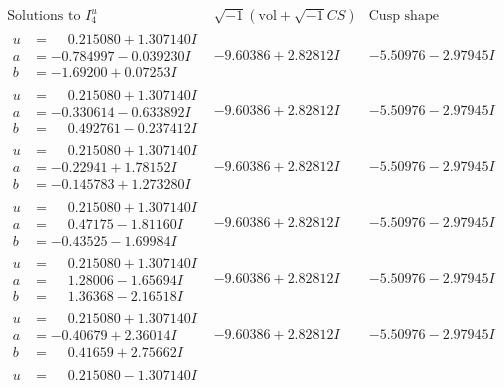 \documentclass[1p]{elsarticle_modified}
\theoremstyle{definition}
\newcommand{\I}{\sqrt{-1}}
\begin{document}
$$\begin{array}{c|c|c}  
\text{Solutions to }I^u_{4}& \I (\text{vol} + \sqrt{-1}CS) & \text{Cusp shape}\\
 \hline 
\begin{aligned}
u &= \phantom{-}0.215080 + 1.307140 I \\
a &= -0.784997 - 0.039230 I \\
b &= -1.69200 + 0.07253 I\end{aligned}
 & -9.60386 + 2.82812 I & -5.50976 - 2.97945 I \\ \hline\begin{aligned}
u &= \phantom{-}0.215080 + 1.307140 I \\
a &= -0.330614 - 0.633892 I \\
b &= \phantom{-}0.492761 - 0.237412 I\end{aligned}
 & -9.60386 + 2.82812 I & -5.50976 - 2.97945 I \\ \hline\begin{aligned}
u &= \phantom{-}0.215080 + 1.307140 I \\
a &= -0.22941 + 1.78152 I \\
b &= -0.145783 + 1.273280 I\end{aligned}
 & -9.60386 + 2.82812 I & -5.50976 - 2.97945 I \\ \hline\begin{aligned}
u &= \phantom{-}0.215080 + 1.307140 I \\
a &= \phantom{-}0.47175 - 1.81160 I \\
b &= -0.43525 - 1.69984 I\end{aligned}
 & -9.60386 + 2.82812 I & -5.50976 - 2.97945 I \\ \hline\begin{aligned}
u &= \phantom{-}0.215080 + 1.307140 I \\
a &= \phantom{-}1.28006 - 1.65694 I \\
b &= \phantom{-}1.36368 - 2.16518 I\end{aligned}
 & -9.60386 + 2.82812 I & -5.50976 - 2.97945 I \\ \hline\begin{aligned}
u &= \phantom{-}0.215080 + 1.307140 I \\
a &= -0.40679 + 2.36014 I \\
b &= \phantom{-}0.41659 + 2.75662 I\end{aligned}
 & -9.60386 + 2.82812 I & -5.50976 - 2.97945 I \\ \hline\begin{aligned}
u &= \phantom{-}0.215080 - 1.307140 I \\

\end{aligned}
\end{array}$$
\end{document}
